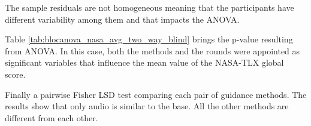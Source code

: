The sample residuals are not homogeneous meaning that the participants have different variability among them and that impacts the ANOVA.

Table \ref{tab:blocanova_nasa_avg_two_way_blind} brings the p-value resulting from ANOVA. In this case, both the methods and the rounds were appointed as significant variables that influence the mean value of the NASA-TLX global score. 



Finally a pairwise Fisher LSD test comparing each pair of guidance methods. The results show that only audio is similar to the base. All the other methods are different from each other.